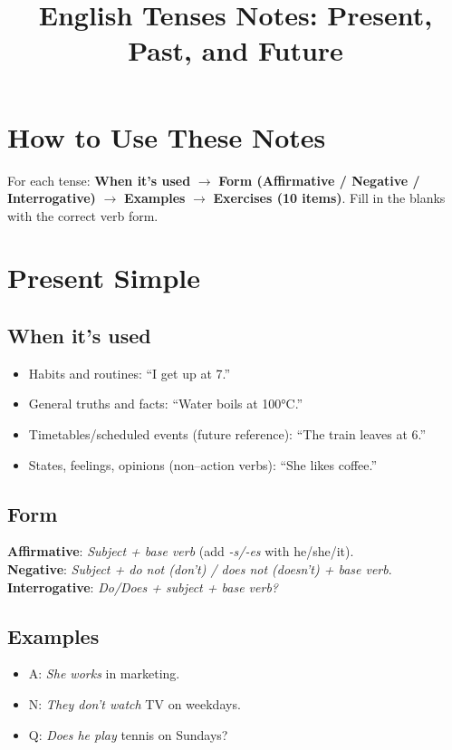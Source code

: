 \documentclass[11pt,a4paper]{article}
\title{English Tenses Notes: Present, Past, and Future}
\author{}
\date{}
\begin{document}
\maketitle

\section*{How to Use These Notes}
For each tense: \textbf{When it’s used} $\to$ \textbf{Form (Affirmative / Negative / Interrogative)} $\to$ \textbf{Examples} $\to$ \textbf{Exercises (10 items)}. Fill in the blanks with the correct verb form.

\section{Present Simple}
\subsection*{When it’s used}
\begin{itemize}
  \item Habits and routines: ``I get up at 7.''
  \item General truths and facts: ``Water boils at 100°C.''
  \item Timetables/scheduled events (future reference): ``The train leaves at 6.''
  \item States, feelings, opinions (non–action verbs): ``She likes coffee.''
\end{itemize}

\subsection*{Form}
\textbf{Affirmative}: \emph{Subject + base verb} (add \emph{-s/-es} with he/she/it).\\
\textbf{Negative}: \emph{Subject + do not (don't) / does not (doesn't) + base verb}.\\
\textbf{Interrogative}: \emph{Do/Does + subject + base verb?}

\subsection*{Examples}
\begin{itemize}
  \item A: \emph{She works} in marketing.
  \item N: \emph{They don't watch} TV on weekdays.
  \item Q: \emph{Does he play} tennis on Sundays?
\end{itemize}
\end{document}
